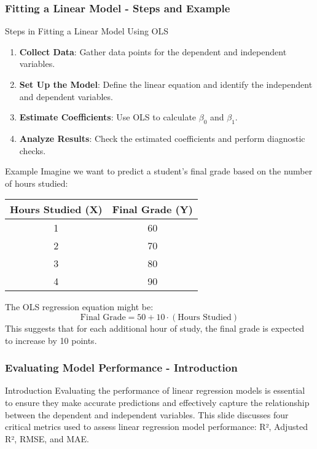 \documentclass{beamer}
\begin{document}
\begin{frame}[fragile]
    \frametitle{Fitting a Linear Model - Steps and Example}
    \begin{block}{Steps in Fitting a Linear Model Using OLS}
        \begin{enumerate}
            \item \textbf{Collect Data}: Gather data points for the dependent and independent variables.
            \item \textbf{Set Up the Model}: Define the linear equation and identify the independent and dependent variables.
            \item \textbf{Estimate Coefficients}: Use OLS to calculate \(\beta_0\) and \(\beta_1\).
            \item \textbf{Analyze Results}: Check the estimated coefficients and perform diagnostic checks.
        \end{enumerate}
    \end{block}

    \begin{block}{Example}
        Imagine we want to predict a student’s final grade based on the number of hours studied:
        \begin{center}
        \begin{tabular}{|c|c|}
            \hline
            Hours Studied (X) & Final Grade (Y) \\
            \hline
            1 & 60 \\
            2 & 70 \\
            3 & 80 \\
            4 & 90 \\
            \hline
        \end{tabular}
        \end{center}
        The OLS regression equation might be:
        \begin{equation}
            \text{Final Grade} = 50 + 10 \cdot (\text{Hours Studied})
        \end{equation}
        This suggests that for each additional hour of study, the final grade is expected to increase by 10 points.
    \end{block}
\end{frame}

\begin{frame}[fragile]
    \frametitle{Evaluating Model Performance - Introduction}
    \begin{block}{Introduction}
        Evaluating the performance of linear regression models is essential to ensure they make accurate predictions and effectively capture the relationship between the dependent and independent variables. This slide discusses four critical metrics used to assess linear regression model performance: R², Adjusted R², RMSE, and MAE.
    \end{block}
\end{frame}
\end{document}
